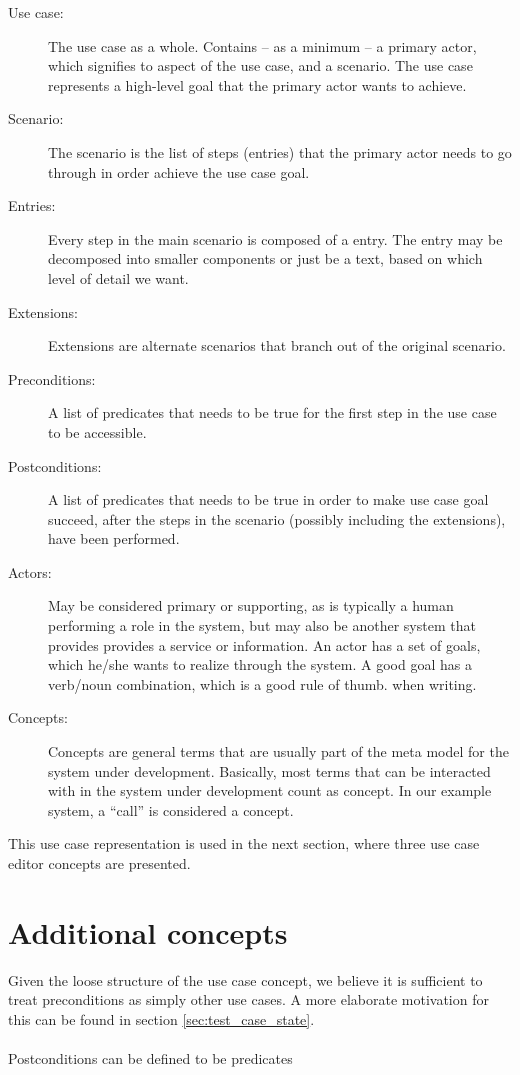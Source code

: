 \begin{description}
  \item[Use case:] The use case as a whole. Contains -- as a minimum -- a primary actor, which signifies to aspect of the use case, and a scenario. The use case represents a high-level goal that the primary actor wants to achieve.
  \item[Scenario:] The scenario is the list of steps (entries) that the primary actor needs to go through in order achieve the use case goal.
  \item[Entries:] Every step in the main scenario is composed of a entry. The entry may be decomposed into smaller components or just be a text, based on which level of detail we want. 
  \item[Extensions:] Extensions are alternate scenarios that branch out of the original scenario. 
  \item[Preconditions:] A list of predicates that needs to be true for the first step in the use case to be accessible.
  \item[Postconditions:] A list of predicates that needs to be true in order to make use case goal succeed, after the steps in the scenario (possibly including the extensions), have been performed.
  \item[Actors:] May be considered primary or supporting, as is typically a human performing a role in the system, but may also be another system that provides provides a service or information. An actor has a set of goals, which he/she wants to realize through the system. A good goal has a verb/noun combination, which is a good rule of thumb. when writing.
  \item[Concepts:] Concepts are general terms that are usually part of the meta model for the system under development. Basically, most terms that can be interacted with in the system under development count as concept. In our example system, a ``call'' is considered a concept.
\end{description}
This use case representation is used in the next section, where three use case editor concepts are presented.




\section{Additional concepts}
Given the loose structure of the use case concept, we believe it is sufficient to treat preconditions as simply other use cases. A more elaborate motivation for this can be found in section \ref{sec:test_case_state}.\\\\
Postconditions can be defined to be predicates

